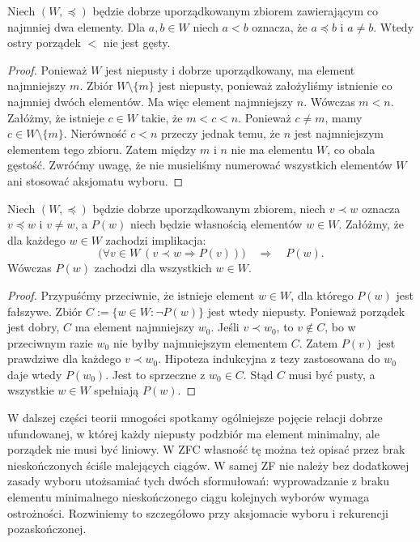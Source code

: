 \begin{twierdzenie}\label{thm:well-order-not-dense}
Niech $(W,\preceq)$ będzie dobrze uporządkowanym zbiorem
zawierającym co najmniej dwa elementy. Dla $a,b\in W$
niech $a<b$ oznacza, że $a\preceq b$ i $a\ne b$.
Wtedy ostry porządek $<$
nie jest gęsty.
\end{twierdzenie}
\begin{proof}
Ponieważ $W$ jest niepusty i dobrze uporządkowany,
ma element najmniejszy $m$. Zbiór $W\setminus\{m\}$
jest niepusty, ponieważ założyliśmy istnienie co
najmniej dwóch elementów. Ma więc element najmniejszy $n$.
Wówczas $m<n$. Załóżmy, że istnieje $c\in W$
takie, że $m<c<n$.
Ponieważ $c\ne m$, mamy $c\in W\setminus\{m\}$.
Nierówność $c<n$ przeczy jednak temu, że $n$ jest
najmniejszym elementem tego zbioru.
Zatem między $m$ i $n$ nie ma elementu $W$, co obala
gęstość. Zwróćmy uwagę, że nie musieliśmy
numerować wszystkich elementów $W$ ani stosować
aksjomatu wyboru.
\end{proof}

\begin{twierdzenie}
\label{thm:well-order-induction}
Niech $(W,\preceq)$ będzie dobrze uporządkowanym zbiorem,
niech $v\prec w$ oznacza $v\preceq w$ i $v\ne w$,
a $P(w)$ niech będzie własnością elementów $w\in W$.
Załóżmy, że dla każdego $w\in W$ zachodzi implikacja:
\[
 \bigl(\forall v\in W\ (v\prec w\Rightarrow P(v))\bigr)
 \quad\Longrightarrow\quad P(w).
\]
Wówczas $P(w)$ zachodzi dla wszystkich $w\in W$.
\end{twierdzenie}
\begin{proof}
Przypuśćmy przeciwnie, że istnieje element $w\in W$,
dla którego $P(w)$ jest fałszywe. Zbiór
$C:=\{w\in W:\neg P(w)\}$ jest wtedy niepusty.
Ponieważ porządek jest dobry, $C$ ma element najmniejszy
$w_0$. Jeśli $v\prec w_0$, to $v\notin C$,
bo w przeciwnym razie $w_0$ nie byłby najmniejszym
elementem $C$. Zatem $P(v)$ jest prawdziwe dla
każdego $v\prec w_0$. Hipoteza indukcyjna z tezy
zastosowana do $w_0$ daje wtedy $P(w_0)$.
Jest to sprzeczne z $w_0\in C$. Stąd $C$ musi być pusty,
a wszystkie $w\in W$ spełniają $P(w)$.
\end{proof}

\begin{uwaga}
W dalszej części teorii mnogości spotkamy ogólniejsze pojęcie
relacji dobrze ufundowanej, w której każdy niepusty podzbiór
ma element minimalny, ale porządek nie musi być liniowy.
W ZFC własność tę można też opisać przez brak nieskończonych
ściśle malejących ciągów. W samej ZF nie należy bez dodatkowej
zasady wyboru utożsamiać tych dwóch sformułowań: wyprowadzanie
z braku elementu minimalnego nieskończonego ciągu kolejnych
wyborów wymaga ostrożności. Rozwiniemy to szczegółowo przy
aksjomacie wyboru i rekurencji pozaskończonej.
\end{uwaga}


